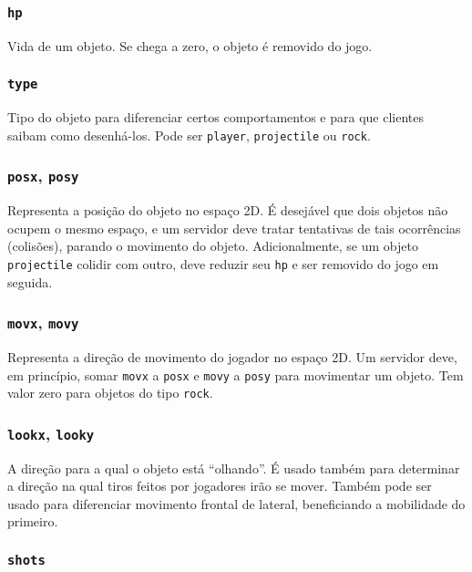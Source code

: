 \documentclass[12pt,a4paper]{article}
\begin{document}
\subsubsection{\texttt{hp}}

Vida de um objeto. Se chega a zero, o objeto é removido do jogo.

\subsubsection{\texttt{type}}

Tipo do objeto para diferenciar certos comportamentos e para que clientes
saibam como desenhá-los. Pode ser \texttt{player}, \texttt{projectile} ou
\texttt{rock}.

\subsubsection{\texttt{posx}, \texttt{posy}}

Representa a posição do objeto no espaço 2D. É desejável que dois objetos não
ocupem o mesmo espaço, e um servidor deve tratar tentativas de tais ocorrências
(colisões), parando o movimento do objeto. Adicionalmente, se um objeto
\texttt{projectile} colidir com outro, deve reduzir seu \texttt{hp} e ser
removido do jogo em seguida.

\subsubsection{\texttt{movx}, \texttt{movy}}

Representa a direção de movimento do jogador no espaço 2D. Um servidor deve, em
princípio, somar \texttt{movx} a \texttt{posx} e \texttt{movy} a \texttt{posy}
para movimentar um objeto. Tem valor zero para objetos do tipo \texttt{rock}.

\subsubsection{\texttt{lookx}, \texttt{looky}}

A direção para a qual o objeto está ``olhando''. É usado também para determinar
a direção na qual tiros feitos por jogadores irão se mover. Também pode ser
usado para diferenciar movimento frontal de lateral, beneficiando a mobilidade
do primeiro.

\subsubsection{\texttt{shots}}
\end{document}
